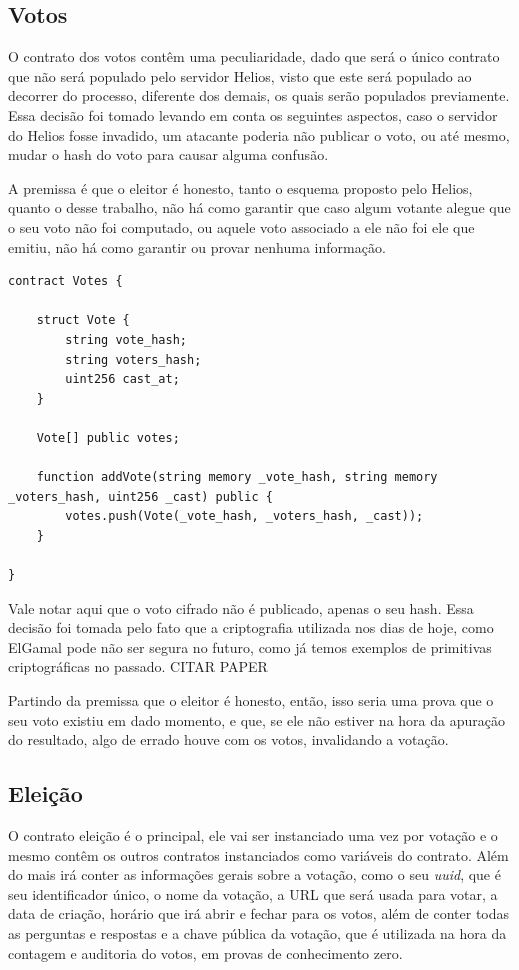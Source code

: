 \documentclass{ufsctex/ufsctex}
\begin{document}
\subsection{Votos}

O contrato dos votos contêm uma peculiaridade, dado que será o único contrato
que não será populado pelo servidor Helios, visto que este será populado ao
decorrer do processo, diferente dos demais, os quais serão populados
previamente.  Essa decisão foi tomado levando em conta os seguintes aspectos,
caso o servidor do Helios fosse invadido, um atacante poderia não publicar o
voto, ou até mesmo, mudar o hash do voto para causar alguma confusão. 

A premissa é que o eleitor é honesto, tanto o esquema proposto pelo Helios,
quanto o desse trabalho, não há como garantir que caso algum votante alegue que
o seu voto não foi computado, ou aquele voto associado a ele não foi ele que
emitiu, não há como garantir ou provar nenhuma informação.

\begin{lstlisting}[language=Solidity]
contract Votes {
    
    struct Vote {
        string vote_hash;
        string voters_hash;
        uint256 cast_at;
    }
    
    Vote[] public votes;
    
    function addVote(string memory _vote_hash, string memory _voters_hash, uint256 _cast) public {
        votes.push(Vote(_vote_hash, _voters_hash, _cast));
    }
    
}
\end{lstlisting}

Vale notar aqui que o voto cifrado não é publicado, apenas o seu hash. Essa
decisão foi tomada pelo fato que a criptografia utilizada nos dias de hoje,
como ElGamal pode não ser segura no futuro, como já temos exemplos de
primitivas criptográficas no passado. CITAR PAPER

Partindo da premissa que o eleitor é honesto, então, isso seria uma prova que o
seu voto existiu em dado momento, e que, se ele não estiver na hora da apuração
do resultado, algo de errado houve com os votos, invalidando a votação.

\subsection{Eleição}

O contrato eleição é o principal, ele vai ser instanciado uma vez por votação e
o mesmo contêm os outros contratos instanciados como variáveis do contrato.
Além do mais irá conter as informações gerais sobre a votação, como o seu
\textit{uuid}, que é seu identificador único, o nome da votação, a URL que será
usada para votar, a data de criação, horário que irá abrir e fechar para os
votos, além de conter todas as perguntas e respostas e a chave pública da
votação, que é utilizada na hora da contagem e auditoria do votos, em provas de
conhecimento zero.
\end{document}
